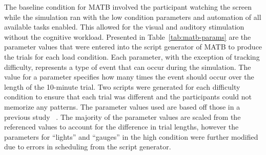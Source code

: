 \documentclass[11pt]{article}
\begin{document}
	\begin{table}[]
	\centering
	\caption[Multi-Attribute Task Battery (MATB) Load Condition Parameters]{Parameters used in MATB script generator specifying subtask difficulty and event occurrences per 10-minute trial}
	
	\label{tab:matb-params}
	\end{table}
	
	The baseline condition for MATB involved the participant watching the screen while the simulation ran with the low condition parameters and automation of all available tasks enabled. This allowed for the visual and auditory stimulation without the cognitive workload. Presented in Table~\ref{tab:matb-params} are the parameter values that were entered into the script generator of MATB to produce the trials for each load condition. Each parameter, with the exception of tracking difficulty, represents a type of event that can occur during the simulation. The value for a parameter specifies how many times the event should occur over the length of the 10-minute trial. Two scripts were generated for each difficulty condition to ensure that each trial was different and the participants could not memorize any patterns. The parameter values used are based off those in a previous study ~\cite{Estepp_2015}. The majority of the parameter values are scaled from the referenced values to account for the difference in trial lengths, however the parameters for ``lights'' and ``gauges'' in the high condition were further modified due to errors in scheduling from the script generator. 
	
	
\end{document}
